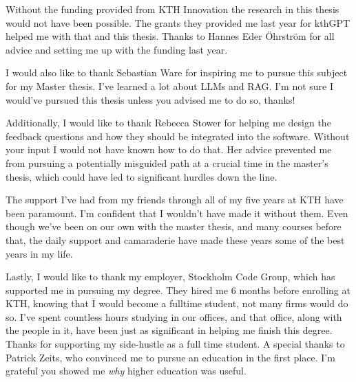 Without the funding provided from KTH Innovation the research in this thesis would not have been possible. The grants they provided me last year for kthGPT helped me with that and this thesis. Thanks to Hannes Eder Öhrström for all advice and setting me up with the funding last year.


I would also like to thank Sebastian Ware for inspiring me to pursue this subject for my Master thesis. I’ve learned a lot about LLMs and RAG. I’m not sure I would’ve pursued this thesis unless you advised me to do so, thanks!


Additionally, I would like to thank Rebecca Stower for helping me design the feedback questions and how they should be integrated into the software. Without your input I would not have known how to do that. Her advice prevented me from pursuing a potentially misguided path at a crucial time in the master’s thesis, which could have led to significant hurdles down the line.


The support I’ve had from my friends through all of my five years at KTH have been paramount. I’m confident that I wouldn't have made it without them. Even though we’ve been on our own with the master thesis, and many courses before that, the daily support and camaraderie have made these years some of the best years in my life.


Lastly, I would like to thank my employer, Stockholm Code Group, which has supported me in pursuing my degree. They hired me 6 months before enrolling at KTH, knowing that I would become a fulltime student, not many firms would do so. I’ve spent countless hours studying in our offices, and that office, along with the people in it, have been just as significant in helping me finish this degree. Thanks for supporting my side-hustle as a full time student. A special thanks to Patrick Zeits, who convinced me to pursue an education in the first place. I’m grateful you showed me \textit{why} higher education was useful.


\acknowlegmentssignature